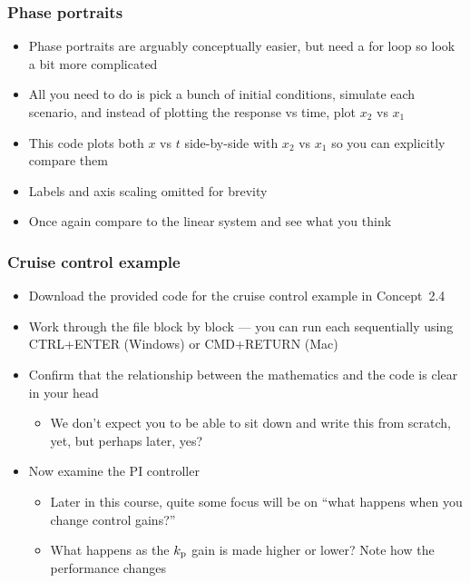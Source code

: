 \documentclass[9pt]{beamer-control}
\begin{document}
\begin{frame}
  \frametitle{Phase portraits}
  \begin{itemize}
    \item
      Phase portraits are arguably conceptually easier, but need a for loop so look a bit more complicated
    \item
      All you need to do is pick a bunch of initial conditions, simulate each scenario, and instead of plotting the response vs time, plot $x_2$ vs $x_1$
    \item
      This code plots both $x$ vs $t$ side-by-side with $x_2$ vs $x_1$  so you can explicitly compare them
    \item
      Labels and axis scaling omitted for brevity
    \item
      Once again compare to the linear system and see what you think
  \end{itemize}


\end{frame}


\begin{frame}
  \frametitle{Cruise control example}
  \begin{itemize}
    \item Download the provided code for the cruise control example in Concept~2.4
    \item Work through the file block by block --- you can run each sequentially using CTRL+ENTER (Windows) or CMD+RETURN (Mac)
    \item Confirm that the relationship between the mathematics and the code is clear in your head
      \begin{itemize}
        \item We don't expect you to be able to sit down and write this from scratch, yet, but perhaps later, yes?
      \end{itemize}
    \item Now examine the PI controller
      \begin{itemize}
        \item
          Later in this course, quite some focus will be on ``what happens when you change control gains?''
        \item
          What happens as the $k_{\mathrm{p}}$ gain is made higher or lower? Note how the performance changes
      \end{itemize}
  \end{itemize}
\end{frame}
\end{document}
